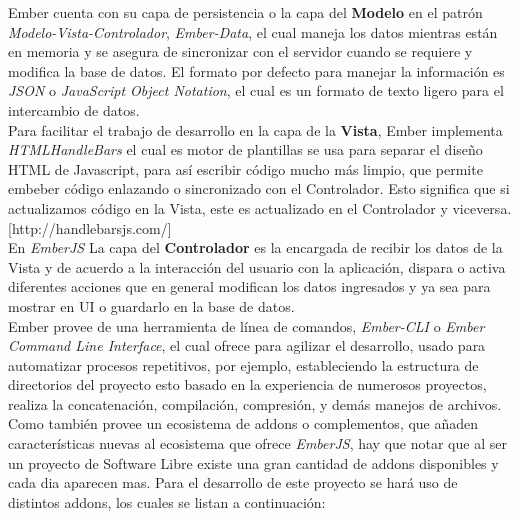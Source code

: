 Ember cuenta con su capa de persistencia o la capa del \textbf{Modelo} en el patrón \emph{Modelo-Vista-Controlador}, \emph{Ember-Data}, el cual maneja los datos mientras están en memoria y se asegura de sincronizar con el servidor cuando se requiere y modifica la base de datos. El formato por defecto para manejar la información es \emph{JSON} o \emph{JavaScript Object Notation}, el cual es un formato de texto ligero para el intercambio de datos.\\


Para facilitar el trabajo de desarrollo en la capa de la \textbf{Vista}, Ember implementa \emph{HTMLHandleBars} el cual es motor de plantillas se usa para separar el diseño HTML de Javascript, para así escribir código mucho más limpio, que permite embeber código enlazando o sincronizado con el Controlador. Esto significa que si actualizamos código en la Vista, este es actualizado en el Controlador y viceversa. [http://handlebarsjs.com/] \\



En \emph{EmberJS} La capa del \textbf{Controlador} es  la encargada de recibir los datos de la Vista y de acuerdo a la interacción del usuario con la aplicación, dispara o activa diferentes acciones que en general modifican los datos ingresados y ya sea para mostrar en UI o guardarlo en la base de datos.\\


Ember provee de una herramienta de línea de comandos, \emph{Ember-CLI} o \emph{Ember Command Line Interface}, el cual ofrece para agilizar el desarrollo, usado para automatizar procesos repetitivos, por ejemplo, estableciendo la estructura de directorios del proyecto esto basado en la experiencia de numerosos proyectos, realiza la concatenación, compilación, compresión, y demás manejos de archivos. Como también provee un ecosistema de addons o complementos, que añaden  características nuevas al ecosistema que ofrece \emph{EmberJS}, hay que notar que al ser un proyecto de Software Libre existe una gran cantidad de addons disponibles y cada dia aparecen mas.
Para el desarrollo de este proyecto se hará uso de distintos addons, los cuales se listan a continuación:

